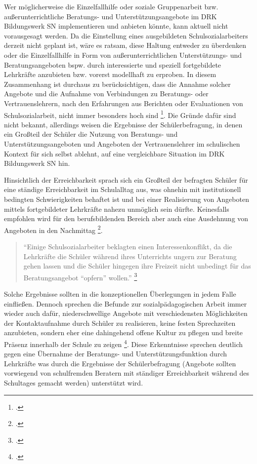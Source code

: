 Wer möglicherweise die Einzelfallhilfe oder soziale Gruppenarbeit bzw. außerunterrichtliche Beratungs- und Unterstützungsangebote im DRK Bildungswerk SN implementieren und anbieten könnte, kann aktuell nicht vorausgesagt werden. Da die Einstellung eines ausgebildeten Schulsozialarbeiters derzeit nicht geplant ist, wäre es ratsam, diese Haltung entweder zu überdenken oder die Einzelfallhilfe in Form von außerunterrichtlichen Unterstützungs- und Beratungsangeboten bspw. durch interessierte und speziell fortgebildete Lehrkräfte anzubieten bzw. vorerst modellhaft zu erproben. In diesem Zusammenhang ist durchaus zu berücksichtigen, dass die Annahme solcher Angebote und die Aufnahme von Verbindungen zu Beratungs- oder Vertrauenslehrern, nach den Erfahrungen aus Berichten oder Evaluationen von Schulsozialarbeit, nicht immer besonders hoch sind \footcite[vgl.][17f]{LSS2004}. Die Gründe dafür sind nicht bekannt, allerdings weisen die Ergebnisse der Schülerbefragung, in denen ein Großteil der Schüler die Nutzung von Beratungs- und Unterstützungsangeboten und Angeboten der Vertrauenslehrer im schulischen Kontext für sich selbst ablehnt, auf eine vergleichbare Situation im DRK Bildungswerk SN hin. 

Hinsichtlich der Erreichbarkeit sprach sich ein Großteil der  befragten Schüler für eine ständige Erreichbarkeit im Schulalltag aus, was ohnehin mit institutionell bedingten Schwierigkeiten behaftet ist und bei einer Realisierung von Angeboten mittels fortgebildeter Lehrkräfte nahezu unmöglich sein dürfte. Keinesfalls empfohlen wird für den berufsbildenden Bereich aber auch eine Ausdehnung von Angeboten in den  Nachmittag \footcite[vgl.][17f]{LSS2004}.

\begin{quotation}
\noindent
"`Einige Schulsozialarbeiter beklagten einen Interessenkonflikt, da die Lehrkräfte die Schüler während ihres Unterrichts ungern zur Beratung gehen lassen und die Schüler hingegen ihre Freizeit nicht unbedingt für das Beratungsangebot "`opfern"' wollen."' \footcite[93]{Ganser2004}
\end{quotation}

\noindent
Solche Ergebnisse sollten in die konzeptionellen Überlegungen in jedem Falle einfließen. Dennoch sprechen die Befunde zur sozialpädagogischen Arbeit immer wieder auch dafür, niederschwellige Angebote mit verschiedensten Möglichkeiten der Kontaktaufnahme durch Schüler zu realisieren, keine festen Sprechzeiten anzubieten, sondern eher eine dahingehend offene Kultur zu pflegen und breite Präsenz innerhalb der Schule zu zeigen \footcite[vgl.][48]{Essers2012}. Diese Erkenntnisse sprechen deutlich gegen eine Übernahme der Beratungs- und Unterstützungsfunktion durch Lehrkräfte was durch die Ergebnisse der Schülerbefragung (Angebote sollten vorwiegend von schulfremden Beratern mit ständiger Erreichbarkeit während des Schultages gemacht werden) unterstützt wird.

